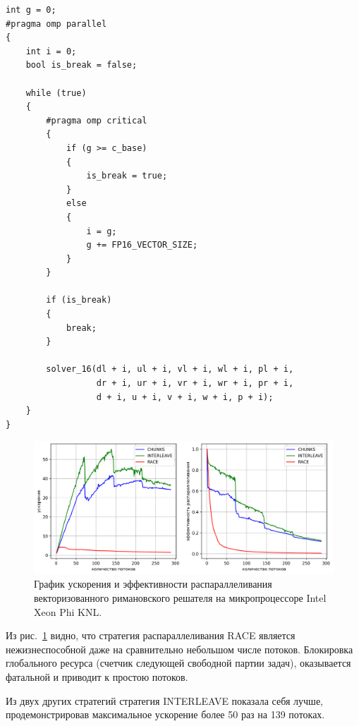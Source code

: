\begin{singlespace}
\begin{lstlisting}[caption={Распараллеливание римановского решателя с помощью стратегии RACE.},label={lst:text_3_strat_race}]
int g = 0;
#pragma omp parallel
{
    int i = 0;
    bool is_break = false;

    while (true)
    {
        #pragma omp critical
        {
            if (g >= c_base)
            {
                is_break = true;
            }
            else
            {
                i = g;
                g += FP16_VECTOR_SIZE;
            }
        }

        if (is_break)
        {
            break;
        }

        solver_16(dl + i, ul + i, vl + i, wl + i, pl + i,
                  dr + i, ur + i, vr + i, wr + i, pr + i,
                  d + i, u + i, v + i, w + i, p + i);
    }
} 
\end{lstlisting}
\end{singlespace}

\begin{figure}[ht]
\centering
\includegraphics[width=1.0\textwidth]{./pics/text_3_omp1/main_graph.png}
\singlespacing
{}\caption{График ускорения и эффективности распараллеливания векторизованного римановского решателя на микропроцессоре Intel Xeon Phi KNL.}
\label{fig:text_3_omp1_main_graph}
\end{figure}

Из рис.~\ref{fig:text_3_omp1_main_graph} видно, что стратегия распараллеливания RACE является нежизнеспособной даже на сравнительно небольшом числе потоков.
Блокировка глобального ресурса (счетчик следующей свободной партии задач), оказывается фатальной и приводит к простою потоков.

Из двух других стратегий стратегия INTERLEAVE показала себя лучше, продемонстрировав максимальное ускорение более 50 раз на 139 потоках.

